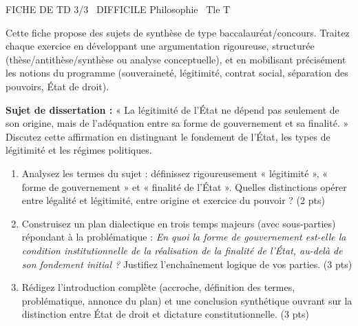\documentclass[11pt]{article}
\begin{document}
\begin{tcolorbox}[enhanced,colback=popink,colframe=popink,arc=10pt,boxrule=0pt,left=12pt,right=12pt,top=9pt,bottom=9pt]
{\color{white}\popxbold\small FICHE DE TD 3/3 \textbullet\ DIFFICILE \hfill Philosophie \textbullet\ Tle T\par}
\end{tcolorbox}
\vspace{4pt}
\noindent Cette fiche propose des sujets de synthèse de type baccalauréat/concours. Traitez chaque exercice en développant une argumentation rigoureuse, structurée (thèse/antithèse/synthèse ou analyse conceptuelle), et en mobilisant précisément les notions du programme (souveraineté, légitimité, contrat social, séparation des pouvoirs, État de droit).

\begin{exercice}
\textbf{Sujet de dissertation :} « La légitimité de l'État ne dépend pas seulement de son origine, mais de l'adéquation entre sa forme de gouvernement et sa finalité. » Discutez cette affirmation en distinguant le fondement de l'État, les types de légitimité et les régimes politiques.
\begin{enumerate}
    \item Analysez les termes du sujet : définissez rigoureusement « légitimité », « forme de gouvernement » et « finalité de l'État ». Quelles distinctions opérer entre légalité et légitimité, entre origine et exercice du pouvoir ? (2 pts)
    \item Construisez un plan dialectique en trois temps majeurs (avec sous-parties) répondant à la problématique : \textit{En quoi la forme de gouvernement est-elle la condition institutionnelle de la réalisation de la finalité de l'État, au-delà de son fondement initial ?} Justifiez l'enchaînement logique de vos parties. (3 pts)
    \item Rédigez l'introduction complète (accroche, définition des termes, problématique, annonce du plan) et une conclusion synthétique ouvrant sur la distinction entre État de droit et dictature constitutionnelle. (3 pts)
\end{enumerate}
\end{exercice}
\end{document}
